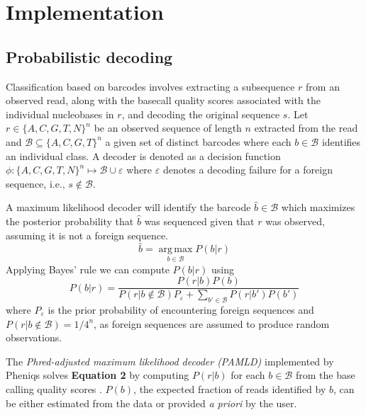 \documentclass[twocolumn]{bmcart}
\begin{document}
\section*{Implementation}

\subsection*{Probabilistic decoding}

Classification based on barcodes involves extracting a subsequence $r$ from an observed read, along with the basecall quality scores associated with the individual nucleobases in $r$, and decoding the original sequence $s$. Let $r \in \{A,C,G,T,N\}^n$ be an observed sequence of length $n$ extracted from the read and $\mathcal{B} \subseteq \{A,C,G,T\}^n$ a given set of distinct barcodes where each $b \in \mathcal{B}$ identifies an individual class. A decoder is denoted as a decision function $\phi: \{A,C,G,T,N\}^n \mapsto \mathcal{B} \cup \varepsilon$ where $\varepsilon$ denotes a decoding failure for a foreign sequence, i.e., $s \notin \mathcal{B}$.

A maximum likelihood decoder will identify the barcode $\hat{b} \in \mathcal{B}$ which maximizes the posterior probability that $\hat{b}$ was sequenced given that $r$ was observed, assuming it is not a foreign sequence.
%
\begin{equation}
\hat{b} = \operatorname*{arg\,max}_{b \in \mathcal{B}} P(b|r)
\end{equation}
%
Applying Bayes' rule we can compute $P(b|r)$ using
%
\begin{equation}
P(b|r) = \frac{P(r|b)P(b)}{P(r|b \notin \mathcal{B})P_{\varepsilon} + \sum_{b' \in \mathcal{B}} P(r|b')P(b')}
\end{equation}
%
where $P_\varepsilon$ is the prior probability of encountering foreign sequences and $P(r|b \notin \mathcal{B}) = 1/4^n$, as foreign sequences are assumed to produce random observations.

The \emph{Phred-adjusted maximum likelihood decoder (PAMLD)} implemented by Pheniqs solves \textbf{Equation 2} by computing $P(r|b)$ for each $b \in \mathcal{B}$ from the base calling quality scores \cite{doi:10.1093/bioinformatics/btv401}. $P(b)$, the expected fraction of reads identified by $b$, can be either estimated from the data or provided \emph{a priori} by the user.
\end{document}

